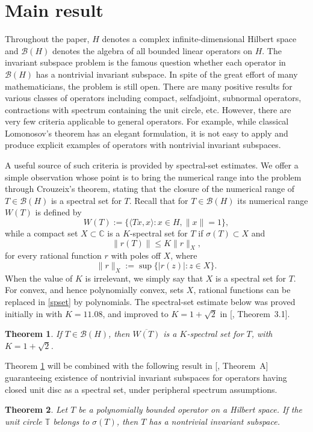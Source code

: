 \documentclass[11pt]{amsart}
\makeatletter
\numberwithin{equation}{section}
\newtheorem{theorem}{Theorem}[section]
\theoremstyle{definition}
\theoremstyle{remark}
\newcommand{\loccite}[2]{[\@ifundefined{b@#2}{\textbf{??}}{\csname b@#2\endcsname}, #1]}
\newcommand{\CC}{\mathbb{C}}
\newcommand{\BH}{\mathcal B(H)}
\makeatother
\begin{document}
\section{Main result}
Throughout the paper, $H$ denotes a complex infinite-dimensional Hilbert space and $\BH$ denotes the algebra of all bounded linear operators on $H$. The invariant subspace problem is the famous question whether each operator in $\BH$ has a nontrivial invariant subspace. In spite of the great effort of many mathematicians, the problem is still open. There are many positive results for various classes of operators including compact, selfadjoint, subnormal operators, contractions with spectrum containing the unit circle, etc.
However, there are very few criteria applicable to general operators. For example, while classical Lomonosov's theorem has an elegant formulation,
it is not easy to apply and produce explicit examples of operators with nontrivial invariant subspaces.


A useful source of such criteria is provided by spectral-set estimates.
We offer a simple observation whose point is to bring the numerical range into the problem through Crouzeix's theorem, stating that the closure of the numerical range of \(T\in\mathcal B(H)\) is a spectral set for \(T\). Recall that
for $T \in \BH$ its numerical range $W(T)$ is defined by
$$
W(T):=\{\langle Tx,x\rangle: x\in H, \|x\|=1\},
$$
while a compact set $X\subset\CC$ is a $K$-spectral set for $T$ if $\sigma(T)\subset X$ and
\begin{equation}\label{spset}
    \|r(T)\|\le K \|r\|_X,
\end{equation}
for every rational function $r$ with poles off $X$, where
\[
    \|r\|_X:=\sup\{|r(z)|:z\in X\}.
\]
When the value of $K$ is irrelevant, we simply say that $X$ is a spectral set for $T$.
For convex, and hence polynomially convex, sets $X$, rational functions can be replaced in \eqref{spset} by polynomials.
The spectral-set estimate below was proved initially in \cite{Crou} with \(K=11.08\), and improved to \(K=1+\sqrt2\) in \loccite{Theorem~3.1}{CP}.
\begin{theorem}\label{crouzeix} 
If $T \in \BH$, then $\overline{W(T)}$ is a $K$-spectral set for $T$, with $K=1+\sqrt2$.
\end{theorem}
Theorem \ref{crouzeix} will be combined 
with the following result in \loccite{Theorem~A}{AM} guaranteeing existence
of nontrivial invariant subspaces for operators having closed unit disc as a spectral set, under
peripheral spectrum assumptions.
\begin{theorem}\label{thm:AM}
Let $T$ be a polynomially bounded operator on a Hilbert space. If the unit circle $\mathbb T$
belongs to $\sigma(T)$, then $T$ has a nontrivial invariant subspace.
\end{theorem}
\end{document}

